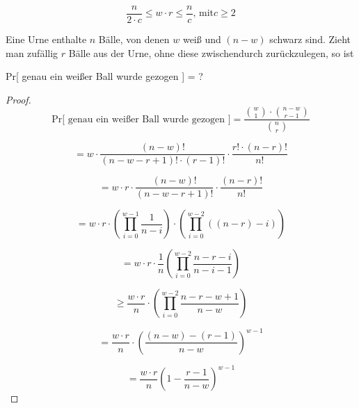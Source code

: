 \documentclass{article}
\begin{document}
\begin{equation}
  \frac{n}{2 \cdot c} \leq w \cdot r \leq \frac{n}{c}\text{, mit} c \geq 2
\end{equation}

Eine Urne enthalte $n$ B{\"a}lle, von denen $w$ wei{\ss} und $(n - w)$ schwarz sind.
Zieht man zuf{\"a}llig $r$ B{\"a}lle aus der Urne, ohne diese zwischendurch
zur{\"u}ckzulegen, so ist
\begin{center}
  Pr[ genau ein wei{\ss}er Ball wurde gezogen ] = ?
\end{center}

\begin{proof}
  \begin{equation}
    \text{Pr[ genau ein wei{\ss}er Ball wurde gezogen ]}
      = \frac{\binom{w}{1} \cdot \binom{n - w}{r - 1}}{\binom{n}{r}}
  \end{equation}

  \begin{equation}
    = w \cdot \frac{(n - w)!}{(n - w - r + 1)! \cdot (r - 1)!} \cdot \frac{r! \cdot (n - r)!}{n!}
  \end{equation}

  \begin{equation}
    = w \cdot r \cdot \frac{(n - w)!}{(n - w - r + 1)!} \cdot \frac{(n - r)!}{n!}
  \end{equation}

  \begin{equation}
    = w \cdot r \cdot \left( \prod\limits_{i = 0}^{w - 1} \frac{1}{n - i} \right) \cdot \left( \prod\limits_{i = 0}^{w - 2} \left( \left( n - r \right) - i \right) \right)
  \end{equation}

  \begin{equation}
    = w \cdot r \cdot \frac{1}{n} \left( \prod\limits_{i = 0}^{w - 2} \frac{n - r - i}{n - i - 1} \right)
  \end{equation}

  \begin{equation}
    \geq \frac{w \cdot r}{n} \cdot \left( \prod\limits_{i = 0}^{w - 2} \frac{n - r - w + 1}{n - w} \right)
  \end{equation}

  \begin{equation}
    = \frac{w \cdot r}{n} \cdot \left( \frac{\left( n - w \right) - \left( r - 1 \right)}{n - w} \right)^{w - 1}
  \end{equation}

  \begin{equation}
    = \frac{w \cdot r}{n} \left( 1 - \frac{r - 1}{n - w} \right)^{w - 1}
  \end{equation}
   

\end{proof}
\end{document}
